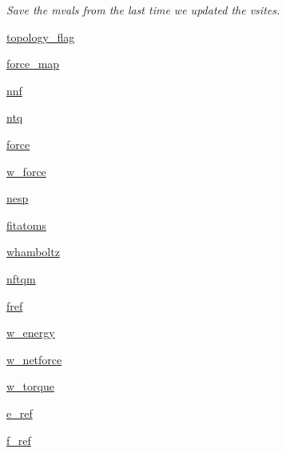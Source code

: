 \begin{DoxyCompactItemize}
\begin{DoxyCompactList}\small\item\em Save the mvals from the last time we updated the vsites. \end{DoxyCompactList}\item 
\hyperlink{classforcebalance_1_1abinitio_1_1AbInitio_a09689e626b75720b097c36f922507950}{topology\-\_\-flag}
\item 
\hyperlink{classforcebalance_1_1abinitio_1_1AbInitio_a6558ea4f56053b0f539f987481c57a75}{force\-\_\-map}
\item 
\hyperlink{classforcebalance_1_1abinitio_1_1AbInitio_ac4a5765bf5b089176518f47004fcdb39}{nnf}
\item 
\hyperlink{classforcebalance_1_1abinitio_1_1AbInitio_af8a895f61ddea6b9ca2765ddbf309a75}{ntq}
\item 
\hyperlink{classforcebalance_1_1abinitio_1_1AbInitio_ab483592ce22356d09b52eb594f2f4b8e}{force}
\item 
\hyperlink{classforcebalance_1_1abinitio_1_1AbInitio_a4ec4863edbb6ea4a28777de905d621d3}{w\-\_\-force}
\item 
\hyperlink{classforcebalance_1_1abinitio_1_1AbInitio_ac258ad6180275ba2ffe5f68d1217e4ac}{nesp}
\item 
\hyperlink{classforcebalance_1_1abinitio_1_1AbInitio_a8b12ea0418108cc6c7693d75cc00227f}{fitatoms}
\item 
\hyperlink{classforcebalance_1_1abinitio_1_1AbInitio_a8f70f017ca8ec54c1acdbc85eff06ab9}{whamboltz}
\item 
\hyperlink{classforcebalance_1_1abinitio_1_1AbInitio_a64ae24d7e979723e65358e227b132a4a}{nftqm}
\item 
\hyperlink{classforcebalance_1_1abinitio_1_1AbInitio_ac974dfef45b416947dd21876443d808a}{fref}
\item 
\hyperlink{classforcebalance_1_1abinitio_1_1AbInitio_aa7f09e2ffc1253844c9f0736caf9b9e5}{w\-\_\-energy}
\item 
\hyperlink{classforcebalance_1_1abinitio_1_1AbInitio_af7cbfd50ca6a0b408c417e8d3bdb7cf3}{w\-\_\-netforce}
\item 
\hyperlink{classforcebalance_1_1abinitio_1_1AbInitio_a67643b98cce62c06c95f085d3a3e9722}{w\-\_\-torque}
\item 
\hyperlink{classforcebalance_1_1abinitio_1_1AbInitio_a71d13d3fabd98146c68bb5fc784f6732}{e\-\_\-ref}
\item 
\hyperlink{classforcebalance_1_1abinitio_1_1AbInitio_a6631ee11ee5646d97ea0fa5c9b22fc6a}{f\-\_\-ref}
\item 

\end{DoxyCompactItemize}

